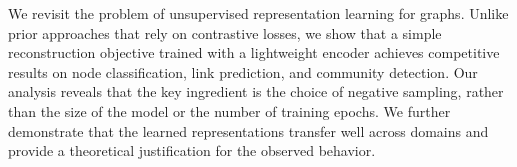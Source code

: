 We revisit the problem of unsupervised representation learning for graphs. Unlike prior approaches that rely on contrastive losses, we show that a simple reconstruction objective trained with a lightweight encoder achieves competitive results on node classification, link prediction, and community detection. Our analysis reveals that the key ingredient is the choice of negative sampling, rather than the size of the model or the number of training epochs. We further demonstrate that the learned representations transfer well across domains and provide a theoretical justification for the observed behavior.
